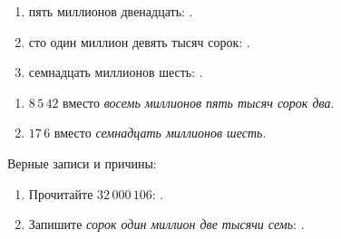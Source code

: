 \begin{practicebox}
  \begin{enumerate}[label=\textbf{\arabic*.}]
    \item пять миллионов двенадцать: \answerblank[48mm].
    \item сто один миллион девять тысяч сорок: \answerblank[48mm].
    \item семнадцать миллионов шесть: \answerblank[48mm].
  \end{enumerate}
\end{practicebox}

\begin{warningbox}
  \begin{enumerate}[label=\textbf{\arabic*.}]
    \item \(8\,5\,42\) вместо \emph{восемь миллионов пять тысяч сорок два}.
    \item \(17\,6\) вместо \emph{семнадцать миллионов шесть}.
  \end{enumerate}
  Верные записи и причины:
\end{warningbox}

\begin{checkpointbox}
  \begin{enumerate}[label=\textbf{\arabic*.}]
    \item Прочитайте \(32\,000\,106\): \answerblank[76mm].
    \item Запишите \emph{сорок один миллион две тысячи семь}:
      \answerblank[44mm].
  \end{enumerate}
\end{checkpointbox}
